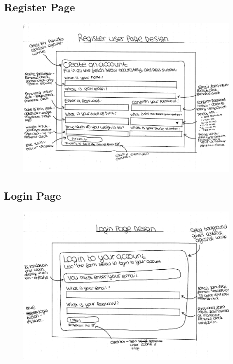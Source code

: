 \documentclass{article}[12pt,a4paper]
\begin{document}
\subsection{Register Page}
\begin{figure}[h!]
  \includegraphics[scale=0.55]{design_ui/register}
\end{figure}
\clearpage

\subsection{Login Page}
\begin{figure}[h!]
  \includegraphics[scale=0.55]{design_ui/login}
\end{figure}
\clearpage
\end{document}
